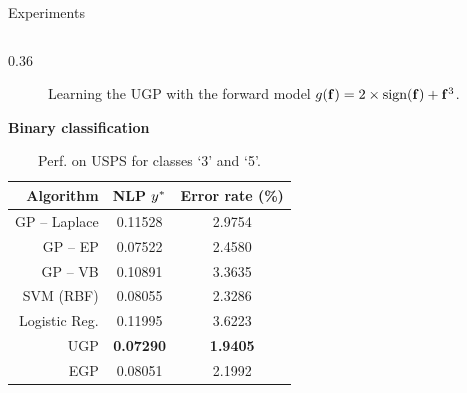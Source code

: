 \documentclass[final]{beamer}
\newlength{\twocolwid}
\begin{document}
\begin{frame}[t]
\begin{columns}[t]
\begin{column}{\twocolwid}
\begin{columns}[t,totalwidth=\twocolwid]
\begin{column}{\twocolwid}
\begin{block}{Experiments}
\begin{columns}
\begin{column}{0.36\twocolwid}
\begin{figure}
    \caption[]{
   Learning the UGP with the forward model $g\!\left({{\mathbf{f}}}\right) =
     2\times\text{sign}\!\left({\mathbf{f}}\right) + \mathbf{f}^3$.    
       }
   \label{fig:sign}
\end{figure}


\textbf{Binary classification}

\begin{table}[tb]
    \centering

    \caption[]{
     Perf. on USPS  for classes `3' and `5'.
    }

    \vspace{5mm}
    \small
    \begin{tabular}{r| c c}
    Algorithm & NLP $y^{*}$ & Error rate (\%) \\
    \toprule
    GP -- Laplace & 0.11528 & 2.9754  \\
    GP -- EP & 0.07522 & 2.4580  \\
    GP -- VB & 0.10891 & 3.3635  \\ 
    SVM (RBF) & 0.08055 & 2.3286  \\
    Logistic Reg. & 0.11995 & 3.6223  \\
    \midrule
    UGP & \textbf{0.07290} & \textbf{1.9405}  \\
    EGP & 0.08051 & 2.1992  \\
    \bottomrule
    \end{tabular}
    \label{tab:class}
\end{table}




\end{column}
\end{columns}
\end{block}
\end{column}
\end{columns}
\end{column}
\end{columns}
\end{frame}
\end{document}
